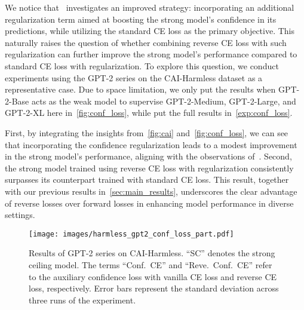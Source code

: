 We notice that~\citet{burns2023weak} investigates an improved strategy: incorporating an additional regularization term aimed at boosting the strong model's confidence in its predictions, while utilizing the standard CE loss as the primary objective.
This naturally raises the question of whether combining reverse CE loss with such regularization can further improve the strong model's performance compared to standard CE loss with regularization.
To explore this question, we conduct experiments using the GPT-2 series on the CAI-Harmless dataset as a representative case. Due to space limitation, we only put the results when GPT-2-Base acts as the weak model to supervise GPT-2-Medium, GPT-2-Large, and GPT-2-XL here in~\cref{fig:conf_loss}, while put the full results in~\cref{exp:conf_loss}. 

First, by integrating the insights from~\cref{fig:cai} and~\cref{fig:conf_loss}, we can see that incorporating the confidence regularization leads to a modest improvement in the strong model's performance, aligning with the observations of~\citet{burns2023weak}.
Second, the strong model trained using reverse CE loss with regularization consistently surpasses its counterpart trained with standard CE loss. 
This result, together with our previous results in~\cref{sec:main_results}, underscores the clear advantage of reverse losses over forward losses in enhancing model performance in diverse settings.


\begin{figure}[t]
    \centering
    \texttt{[image: images/harmless\_gpt2\_conf\_loss\_part.pdf]}
    \caption{Results of GPT-2 series on CAI-Harmless. ``SC'' denotes the strong ceiling model. The terms ``Conf.\ CE'' and ``Reve.\ Conf.\ CE'' refer to the auxiliary confidence loss with vanilla CE loss and reverse CE loss, respectively. Error bars represent the standard deviation across three runs of the experiment.}
    \label{fig:enter-label}
    \vspace{-3pt}
\end{figure}








